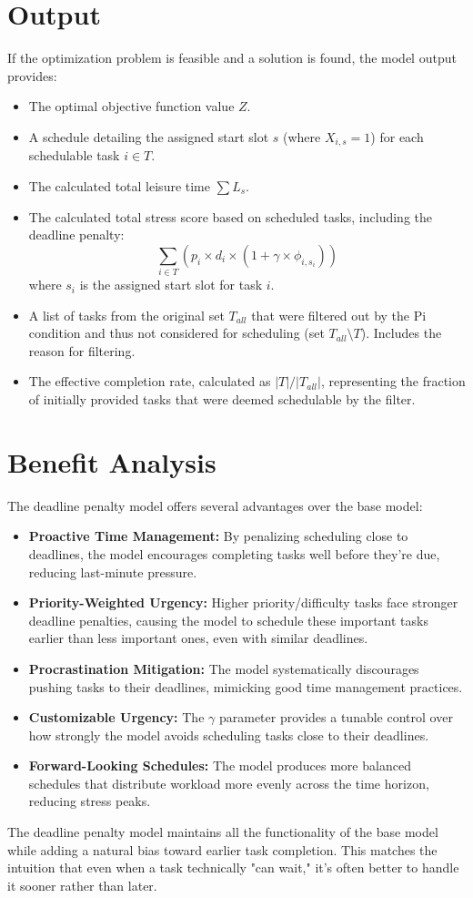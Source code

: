 \documentclass{article}
\begin{document}
\section{Output}

If the optimization problem is feasible and a solution is found, the model output provides:
\begin{itemize}
    \item The optimal objective function value $Z$.
    \item A schedule detailing the assigned start slot $s$ (where $X_{i,s}=1$) for each schedulable task $i \in T$.
    \item The calculated total leisure time $\sum L_s$.
    \item The calculated total stress score based on scheduled tasks, including the deadline penalty: 
    \[ \sum_{i \in T} (p_i \times d_i \times (1 + \gamma \times \phi_{i,s_i})) \]
    where $s_i$ is the assigned start slot for task $i$.
    \item A list of tasks from the original set $T_{all}$ that were filtered out by the Pi condition and thus not considered for scheduling (set $T_{all} \setminus T$). Includes the reason for filtering.
    \item The effective completion rate, calculated as $|T| / |T_{all}|$, representing the fraction of initially provided tasks that were deemed schedulable by the filter.
\end{itemize}

\section{Benefit Analysis}

The deadline penalty model offers several advantages over the base model:

\begin{itemize}
    \item \textbf{Proactive Time Management:} By penalizing scheduling close to deadlines, the model encourages completing tasks well before they're due, reducing last-minute pressure.
    
    \item \textbf{Priority-Weighted Urgency:} Higher priority/difficulty tasks face stronger deadline penalties, causing the model to schedule these important tasks earlier than less important ones, even with similar deadlines.
    
    \item \textbf{Procrastination Mitigation:} The model systematically discourages pushing tasks to their deadlines, mimicking good time management practices.
    
    \item \textbf{Customizable Urgency:} The $\gamma$ parameter provides a tunable control over how strongly the model avoids scheduling tasks close to their deadlines.
    
    \item \textbf{Forward-Looking Schedules:} The model produces more balanced schedules that distribute workload more evenly across the time horizon, reducing stress peaks.
\end{itemize}

The deadline penalty model maintains all the functionality of the base model while adding a natural bias toward earlier task completion. This matches the intuition that even when a task technically "can wait," it's often better to handle it sooner rather than later.
\end{document}

